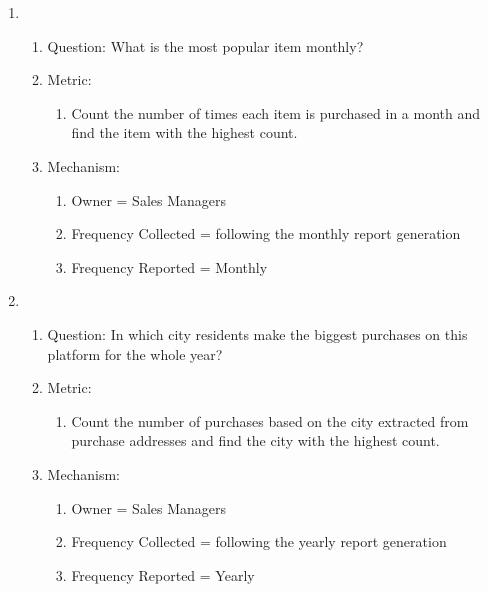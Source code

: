 \documentclass[12pt,letterpaper]{report}
\begin{document}
\begin{enumerate}
\item
    \begin{enumerate}
    \item Question: What is the most popular item monthly?
    \item Metric: 
        \begin{enumerate}
            \item  Count the number of times each item is purchased in a month and find the item with the highest count.
        \end{enumerate}
    \item Mechanism:
	\begin{enumerate}
    \item Owner = Sales Managers
    \item Frequency Collected = following the monthly report generation
    \item Frequency Reported = Monthly
    \end{enumerate}
\end{enumerate}

\item
    \begin{enumerate}
    \item Question: In which city residents make the biggest purchases on this platform for the whole year?
    \item Metric: 
        \begin{enumerate}
            \item  Count the number of purchases based on the city extracted from purchase addresses and find the city with the highest count.
        \end{enumerate}
    \item Mechanism:
	\begin{enumerate}
    \item Owner = Sales Managers
    \item Frequency Collected = following the yearly report generation
    \item Frequency Reported = Yearly
    \end{enumerate}
\end{enumerate}


\end{enumerate}
\end{document}
